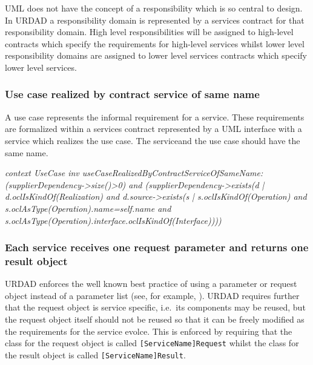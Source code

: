 UML does not have the concept of a responsibility which is so central to design. In URDAD a responsibility
domain is represented by a services contract for that responsibility domain. High level responsibilities
will be assigned to high-level contracts which specify the requirements for high-level services whilst
lower level responsibility domains are assigned to lower level services contracts which specify lower
level services.


\subsubsection{Use case realized by contract service of same name }

A use case represents the informal requirement for a service. These requirements are formalized within
a services contract represented by a UML interface with a service which realizes the use case. The serviceand the use case should have the same name.



\textit{
context UseCase inv useCaseRealizedByContractServiceOfSameName:
(supplierDependency->size()>0) and
(supplierDependency->exists(d | d.oclIsKindOf(Realization) and
d.source->exists(s | s.oclIsKindOf(Operation) and
s.oclAsType(Operation).name=self.name and
s.oclAsType(Operation).interface.oclIsKindOf(Interface))))
}


\subsubsection{Each service receives one request parameter and returns one result object}

URDAD enforces the well known best practice of using a parameter or request object instead of
a parameter list (see, for example, \cite{fowler:refactoring}). URDAD requires further that the
request object is service specific, i.e.\ its components may be reused, but the request object itself
should not be reused so that it can be freely modified as the requirements for the service evolce.
This is enforced by requiring that the class for the request object is called
\verb+[ServiceName]Request+ whilst the class for the result object is called
\verb+[ServiceName]Result+.

